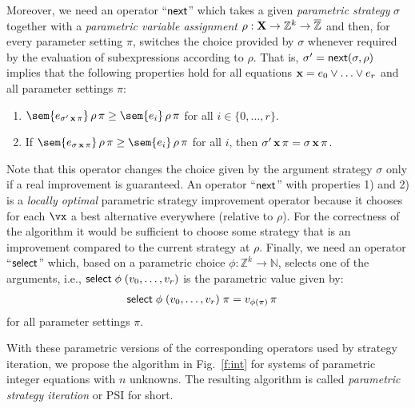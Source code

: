 \documentclass[a4paper]{easychair}
\newcommand{\NN}{\mathbb{N}}
\newcommand{\ZZ}{\mathbb{Z}}
\newcommand{\ZzZ}{\overline{\mathbb Z}}
\begin{document}
Moreover, we need an operator ``${\sf next}$'' which takes a given \emph{parametric strategy} $\sigma$ together with
a \emph{parametric variable assignment} $\rho : {\bf X}\to\ZZ^k\to\ZzZ$ and then, 
for every parameter setting $\pi$, 
switches the choice provided by $\sigma$ whenever required by the evaluation of subexpressions according to 
$\rho$. 
That is, $\sigma' = {\sf next}(\sigma,\rho)$ implies
that the following properties hold for all equations
${\bf x} =e_0\vee\ldots\vee e_r$ and all parameter settings $\pi$:
\begin{enumerate}
\item	$\sem{e_{\sigma'\,{\bf x}\,\pi}}\,\rho\,\pi \geq \sem{e_{i}}\,\rho\,\pi$ for all $i \in \{0,\ldots,r\}$.
\item	If $\sem{e_{\sigma\,{\bf x}\,\pi}}\,\rho\,\pi \geq \sem{e_{i}}\,\rho\,\pi$ for all $i$,
	        then $\sigma'\,{\bf x}\,\pi = \sigma\,{\bf x}\,\pi$.
\end{enumerate}
Note that this operator changes the choice given by the argument strategy $\sigma$ only if a real improvement
is guaranteed.
An operator ``${\sf next}$'' with properties 1) and 2) is a \emph{locally optimal} parametric strategy improvement operator
because it chooses for each $\vx$ a best alternative everywhere (relative to $\rho$).
For the correctness of the algorithm it would be sufficient to choose some strategy that is an improvement compared 
to the current strategy at $\rho$.
Finally, we need an operator ``${\sf select}$'' which, based on a parametric choice 
$\phi:\ZZ^k\to\NN$, selects one of the
arguments, i.e., ${\sf select}\;\phi\;(v_0,\ldots,v_r)$ is the parametric value given by:
\begin{align*}
{\sf select}\;\phi\;(v_0,\ldots,v_r)\;\pi &= v_{\phi(\pi)}\,\pi
\end{align*}
\noindent
for all parameter settings $\pi$.



\noindent
With these parametric versions of the corresponding operators used by strategy iteration,
we propose the algorithm in Fig.\ \ref{f:int} for systems of parametric integer equations
with $n$ unknowns.
The resulting algorithm is called \emph{parametric strategy iteration}
or PSI for short.
\end{document}

